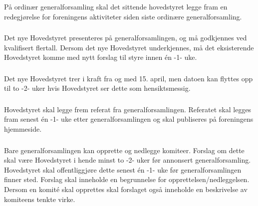 \subsubsection{}
På ordinær generalforsamling skal det sittende hovedstyret legge fram en
redegjørelse for foreningens aktiviteter siden siste ordinære
generalforsamling.

\subsubsection{}
Det nye Hovedstyret presenteres på generalforsamlingen, og må godkjennes ved
kvalifisert flertall. Dersom det nye Hovedstyret underkjennes, må det eksisterende
Hovedstyret komme med nytt forslag til styre innen én -1- uke.

\subsubsection{}
Det nye Hovedstyret trer i kraft fra og med 15. april, men datoen kan flyttes opp til to
-2- uker hvis Hovedstyret ser dette som hensiktsmessig.

\subsubsection{}
Hovedstyret skal legge frem referat fra generalforsamlingen. Referatet skal
legges fram senest én -1- uke etter generalforsamlingen og skal publiseres på
foreningens hjemmeside.

\subsubsection{}
Bare generalforsamlingen kan opprette og nedlegge komiteer. Forslag om dette
skal være Hovedstyret i hende minst to -2- uker før annonsert
generalforsamling. Hovedstyret skal offentliggjøre dette senest én -1- uke før
generalforsamlingen finner sted. Forslag skal inneholde en begrunnelse for
opprettelsen/nedleggelsen. Dersom en komité skal opprettes skal forslaget også
inneholde en beskrivelse av komiteens tenkte virke.

